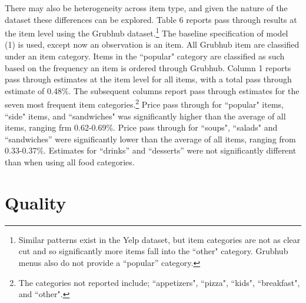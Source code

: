 \documentclass[11pt]{article}
\begin{document}
There may also be heterogeneity across item type, and given the nature of the dataset these differences can be explored. Table 6 reports pass through results at the item level using the Grubhub dataset.\footnote{Similar patterns exist in the Yelp dataset, but item categories are not as clear cut and so significantly more items fall into the ``other" category. Grubhub menus also do not provide a ``popular'' category.} The baseline specification of model (1) is used, except now an observation is an item. All Grubhub item are classified under an item category. Items in the ``popular" category are classified as such based on the frequency an item is ordered through Grubhub. Column 1 reports pass through estimates at the item level for all items, with a total pass through estimate of 0.48\%. The subsequent columns report pass through estimates for the seven most frequent item categories.\footnote{The categories not reported include; ``appetizers", ``pizza", ``kids", ``breakfast", and ``other".} Price pass through for ``popular" items, ``side" items, and ``sandwiches" was significantly higher than the average of all items, ranging frm 0.62-0.69\%. Price pass through  for ``soups", ``salads" and ``sandwiches'' were significantly lower than the average of all items, ranging from 0.33-0.37\%. Estimates for ``drinks'' and ``desserts'' were not significantly different than when using all food categories. 




\section{Quality}
\end{document}
